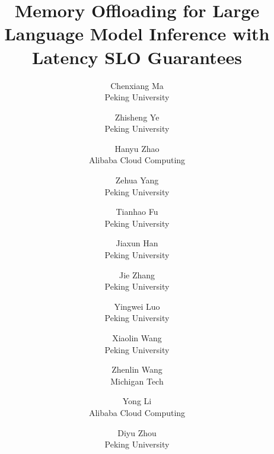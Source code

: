 \documentclass[letterpaper,twocolumn,10pt]{article}
\begin{document}
\date{}


\title{Memory Offloading for Large Language Model Inference with Latency SLO Guarantees}

\author{
{\rm Chenxiang Ma}\\
Peking University
\and
{\rm Zhisheng Ye}\\
Peking University
\and
{\rm Hanyu Zhao}\\
Alibaba Cloud Computing
\and
{\rm Zehua Yang}\\
Peking University
\and
{\rm Tianhao Fu}\\
Peking University
\and
{\rm Jiaxun Han}\\
Peking University
\and
{\rm Jie Zhang}\\
Peking University
\and
{\rm Yingwei Luo}\\
Peking University
\and
{\rm Xiaolin Wang}\\
Peking University
\and
{\rm Zhenlin Wang}\\
Michigan Tech
\and
{\rm Yong Li}\\
Alibaba Cloud Computing
\and
{\rm Diyu Zhou}\\
Peking University
} %

\maketitle

\sloppy









% 



\onecolumn
\begin{multicols}{2}

\nocite{*}


\footnotesize
\setlength{\bibsep}{3pt}


\end{multicols}
\end{document}
